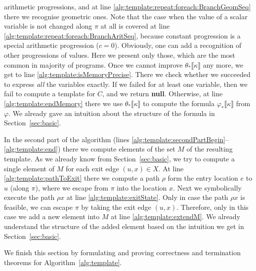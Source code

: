 \documentclass{sig-alternate}%
\newcommand{\prm}[1]{\ensuremath{\llbracket #1 \rrbracket}}
\begin{document}
arithmetic progressions, and at line
\ref{alg:template:repeat:foreach:BranchGeomSeq} there we recognise
geometric ones. Note that the case when the value of a scalar variable is not
changed along $\pi$ at all is covered at line
\ref{alg:template:repeat:foreach:BranchAritSeq}, because constant
progression is a special arithmetic progression ($c = 0$). Obviously,
one can add a recognition of other progressions of values. Here we
present only those, which are the most common in majority of programs.
Once we cannot improve $\theta_*\prm{\kappa}$ any more, we get to line
\ref{alg:template:isMemoryPrecise}. There we check whether we
succeeded to express \emph{all} the variables exactly. If we failed
for at least one variable, then we fail to compute a template for $C$,
and we return \textbf{null}. Otherwise, at line
\ref{alg:template:endMemory} there we use $\theta_*\prm{\kappa}$ to
compute the formula $\varphi_*\prm{\kappa}$ from $\varphi$. We already
gave an intuition about the structure of the formula in
Section~\ref{sec:basic}.

In the second part of the algorithm (lines
\ref{alg:template:secondPartBegin}--\ref{alg:template:end}) there we
compute elements of the set $M$ of the resulting template. As we
already know from Section~\ref{sec:basic}, we try to compute a single 
element of $M$ for each exit edge $(u, x) \in X$. At line
\ref{alg:template:pathToExit} there we compute a path $\rho$ form the
entry location $e$ to $u$ (along $\pi$), where we escape from $\pi$
into the location $x$. Next we symbolically execute the path $\rho x$
at line \ref{alg:template:exitState}. Only in case the path $\rho x$
is feasible, we can escape $\pi$ by taking the exit edge $(u,x)$.
Therefore, only in this case we add a new element into $M$ at line
\ref{alg:template:extendM}. We already understand the structure of the
added element based on the intuition we get in
Section~\ref{sec:basic}.

We finish this section by formulating and proving correctness and
termination theorems for Algorithm~\ref{alg:template}.
\end{document}
